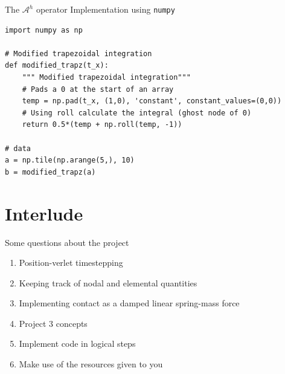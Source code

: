 \documentclass[presentation]{beamer}
\begin{document}
\begin{frame}[label={sec:org3b1fa5c},fragile]{The \(\mathcal{A}^{h}\) operator}
 Implementation using \texttt{numpy}
\begin{verbatim}
import numpy as np

# Modified trapezoidal integration
def modified_trapz(t_x):
    """ Modified trapezoidal integration"""
    # Pads a 0 at the start of an array
    temp = np.pad(t_x, (1,0), 'constant', constant_values=(0,0))
    # Using roll calculate the integral (ghost node of 0)
    return 0.5*(temp + np.roll(temp, -1))

# data
a = np.tile(np.arange(5,), 10)
b = modified_trapz(a)
\end{verbatim}
\end{frame}
\section{Interlude}
\label{sec:org5efd01e}
\begin{frame}[label={sec:org579faf8}]{Some questions about the project}
\begin{enumerate}
\item Position-verlet timestepping
\item Keeping track of nodal and elemental quantities
\item Implementing contact as a damped linear spring-mass force
\item Project 3 concepts
\item Implement code in logical steps
\item Make use of the resources given to you
\end{enumerate}
\end{frame}
\end{document}
